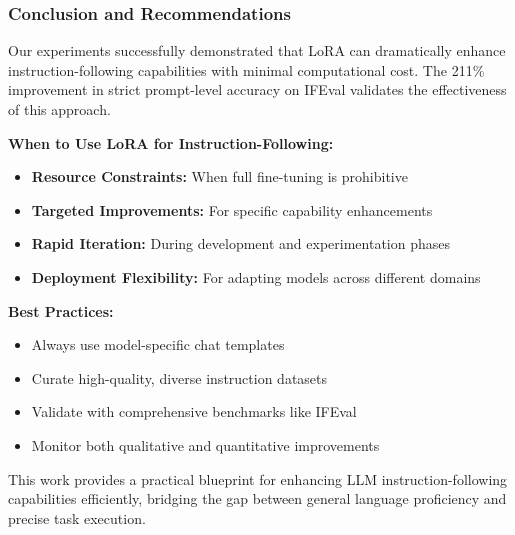 \subsubsection{Conclusion and Recommendations}
Our experiments successfully demonstrated that LoRA can dramatically enhance instruction-following capabilities with minimal computational cost. The 211\% improvement in strict prompt-level accuracy on IFEval validates the effectiveness of this approach.

\textbf{When to Use LoRA for Instruction-Following:}
\begin{itemize}
    \item \textbf{Resource Constraints:} When full fine-tuning is prohibitive
    \item \textbf{Targeted Improvements:} For specific capability enhancements
    \item \textbf{Rapid Iteration:} During development and experimentation phases
    \item \textbf{Deployment Flexibility:} For adapting models across different domains
\end{itemize}

\textbf{Best Practices:}
\begin{itemize}
    \item Always use model-specific chat templates
    \item Curate high-quality, diverse instruction datasets
    \item Validate with comprehensive benchmarks like IFEval
    \item Monitor both qualitative and quantitative improvements
\end{itemize}

This work provides a practical blueprint for enhancing LLM instruction-following capabilities efficiently, bridging the gap between general language proficiency and precise task execution.
